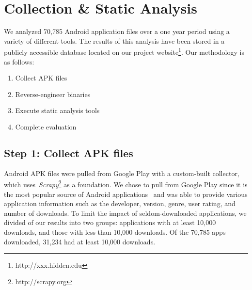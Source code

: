 \documentclass{sig-alternate}
\newcommand{\todo}[1]{\textcolor{cyan}{\textbf{[#1]}}}
\newif\ifisnopii
\begin{document}
\section{Collection \& Static Analysis}
\label{sec: csa}
We analyzed 70,785 Android application files over a one year period using a variety of different tools. The results of this analysis have been stored in a publicly accessible database located on our project website\footnote{\ifisnopii http://darwin.rit.edu \else http://xxx.hidden.edu \fi}. Our methodology is as follows:

\begin{enumerate}
    \setlength{\itemsep}{0pt} %
    \setlength{\parskip}{0pt} %
    \setlength{\parsep}{0pt}  %

  \item Collect APK files
  \item Reverse-engineer binaries
  \item Execute static analysis tools
  \item Complete evaluation
\end{enumerate}

\ifisnopii \todo{Add in Darwin tool information when accepted} \else \fi




\label{sec: collection}
\subsection{Step 1: Collect APK files}

Android APK files were pulled from Google Play with a custom-built collector, which uses~\emph{Scrapy}\footnote{http://scrapy.org} as a foundation. We chose to pull from Google Play since it is the most popular source of Android applications~\cite{listofstores_URL} and was able to provide various application information such as the developer, version, genre, user rating, and number of downloads. To limit the impact of seldom-downloaded applications, we divided of our results into two groups: applications with at least 10,000 downloads, and those with less than 10,000 downloads. Of the 70,785 apps downloaded, 31,234 had at least 10,000 downloads.
\end{document}
